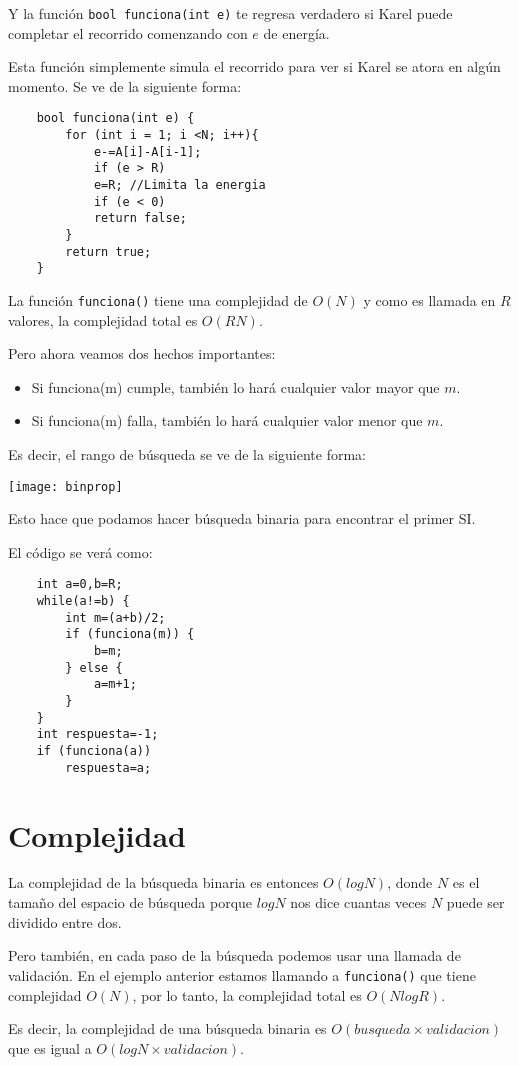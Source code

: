 Y la función \verb|bool funciona(int e)| te regresa verdadero si Karel puede completar el recorrido comenzando con \(e\) de energía.

Esta función simplemente simula el recorrido para ver si Karel se atora en algún momento. Se ve de la siguiente forma:

\begin{lstlisting}
	bool funciona(int e) {
		for (int i = 1; i <N; i++){
			e-=A[i]-A[i-1];
			if (e > R) 
			e=R; //Limita la energia
			if (e < 0)
			return false;			
		}
		return true;
	}
\end{lstlisting}

La función \verb|funciona()| tiene una complejidad de \(O(N)\) y como es llamada en \(R\) valores, la complejidad total es \(O(RN)\).

Pero ahora veamos dos hechos importantes:
\begin{itemize}
	\item Si funciona(m) cumple, también lo hará cualquier valor mayor que \(m\).
	\item Si funciona(m) falla, también lo hará cualquier valor menor que \(m\).
\end{itemize}

Es decir, el rango de búsqueda se ve de la siguiente forma:

\begin{center}
	\texttt{[image: binprop]}
\end{center}

Esto hace que podamos hacer búsqueda binaria para encontrar el primer SI.

El código se verá como:

\begin{minipage}{\linewidth}
\begin{lstlisting}
	int a=0,b=R;
	while(a!=b) {
		int m=(a+b)/2;
		if (funciona(m)) {
			b=m;
		} else {
			a=m+1;
		}
	}
	int respuesta=-1;
	if (funciona(a))
		respuesta=a;
\end{lstlisting}
\end{minipage}

\section{Complejidad}

La complejidad de la búsqueda binaria es entonces \(O(logN)\), donde \(N\) es el tamaño del espacio de búsqueda porque \(logN\) nos dice cuantas veces \(N\) puede ser dividido entre dos. 

Pero también, en cada paso de la búsqueda podemos usar una llamada de validación. En el ejemplo anterior estamos llamando a \verb|funciona()| que tiene complejidad \(O(N)\), por lo tanto, la complejidad total es \(O(NlogR)\).

Es decir, la complejidad de una búsqueda binaria es \(O(busqueda \times validacion)\) que es igual a \(O(logN \times validacion)\).


